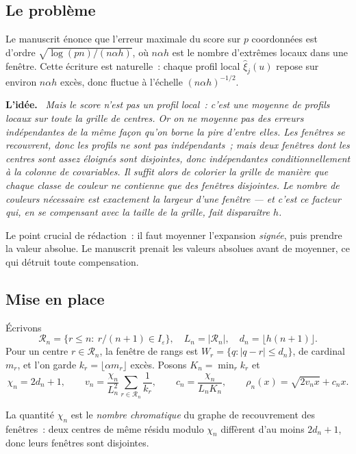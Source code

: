 \documentclass[11pt]{article}
\theoremstyle{plain}
\theoremstyle{definition}
\theoremstyle{remark}
\newcommand{\1}{\mathbf 1}
\newcommand{\I}{I_\varepsilon}
\newenvironment{idee}
  {\par\medskip\noindent\textcolor{bleu}{\textbf{L'idée.}}\ \itshape}
  {\par\medskip}
\begin{document}
\subsection{Le problème}

Le manuscrit énonce que l'erreur maximale du score sur $p$ coordonnées est
d'ordre $\sqrt{\log(pn)/(n\alpha h)}$, où $n\alpha h$ est le nombre
d'extrêmes locaux dans une fenêtre. Cette écriture est naturelle~: chaque
profil local $\widehat\xi_j(u)$ repose sur environ $n\alpha h$ excès, donc
fluctue à l'échelle $(n\alpha h)^{-1/2}$.

\begin{idee}
Mais le score n'est pas un profil local~: c'est une \emph{moyenne} de
profils locaux sur toute la grille de centres. Or on ne moyenne pas des
erreurs indépendantes de la même façon qu'on borne la pire d'entre elles.
Les fenêtres se recouvrent, donc les profils ne sont pas indépendants~;
mais deux fenêtres dont les centres sont assez éloignés sont
\emph{disjointes}, donc indépendantes conditionnellement à la colonne de
covariables. Il suffit alors de colorier la grille de manière que chaque
classe de couleur ne contienne que des fenêtres disjointes. Le nombre de
couleurs nécessaire est exactement la largeur d'une fenêtre --- et c'est
ce facteur qui, en se compensant avec la taille de la grille, fait
disparaître $h$.
\end{idee}

\noindent
Le point crucial de rédaction~: il faut moyenner l'expansion
\emph{signée}, puis prendre la valeur absolue. Le manuscrit prenait les
valeurs absolues avant de moyenner, ce qui détruit toute compensation.

\subsection{Mise en place}

Écrivons
\[
 \mathcal R_n=\{r\le n:\ r/(n+1)\in\I\},\quad L_n=|\mathcal R_n|,\quad
 d_n=\lfloor h(n+1)\rfloor .
\]
Pour un centre $r\in\mathcal R_n$, la fenêtre de rangs est
$W_r=\{q:|q-r|\le d_n\}$, de cardinal $m_r$, et l'on garde
$k_r=\lfloor\alpha m_r\rfloor$ excès. Posons
$K_n=\min_r k_r$ et
\[
 \chi_n=2d_n+1,\qquad
 v_n=\frac{\chi_n}{L_n^2}\sum_{r\in\mathcal R_n}\frac1{k_r},\qquad
 c_n=\frac{\chi_n}{L_nK_n},\qquad
 \rho_n(x)=\sqrt{2v_nx}+c_nx .
\]

\noindent
La quantité $\chi_n$ est le \emph{nombre chromatique} du graphe de
recouvrement des fenêtres~: deux centres de même résidu modulo $\chi_n$
diffèrent d'au moins $2d_n+1$, donc leurs fenêtres sont disjointes.
\end{document}
